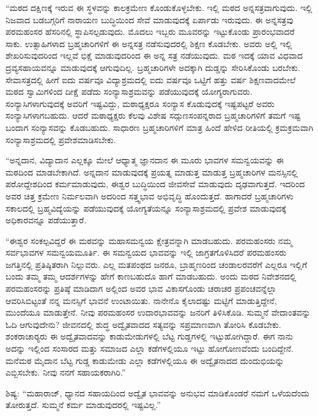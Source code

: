  “ಮಠದ ದಕ್ಷಿಣಕ್ಕೆ ಇರುವ ಈ ಸ್ಥಳವನ್ನು ಕಾಲಕ್ರಮೇಣ ಕೊಂಡುಕೊಳ್ಳಬೇಕು. ಇಲ್ಲಿ ಮಠದ ಅನ್ನಸತ್ರವಾಗುವುದು. ಇಲ್ಲಿ ನಿಜವಾದ ಬಡಬಗ್ಗರಿಗೆ ನಾರಾಯಣ ಬುದ್ಧಿಯಿಂದ ಸೇವೆ ಮಾಡುವುದಕ್ಕೆ ಏರ್ಪಾಡು ಇರುವುದು. ಈ ಅನ್ನಸತ್ರವು ಪರಮಹಂಸರ ಹೆಸರಿನಲ್ಲಿ ಸ್ಥಾಪಿಸಲ್ಪಡುವುದು. ಮೊದಲು ಇಬ್ಬರು ಮೂವರನ್ನು ಇಟ್ಟುಕೊಂಡು ಪ್ರಾರಂಭವಾದರೆ ಸಾಕು. ಉತ್ಸಾಹಿಗಳಾದ ಬ್ರಹ್ಮಚಾರಿಗಳಿಗೆ ಈ ಅನ್ನಸತ್ರ ನಡೆಸುವುದರಲ್ಲಿ ಶಿಕ್ಷಣ ಕೊಡಬೇಕು. ಅವರು ಅಲ್ಲಿ ಇಲ್ಲಿ ಶೇಖರಿಸುವುದರಿಂದ ಇಲ್ಲವೆ ಭಿಕ್ಷೆ ಮಾಡುವುದರಿಂದ ಈ ಅನ್ನ ಸತ್ರ ನಡೆಯುವುದು. ಮಠ ಇದಕ್ಕೆ ಯಾವ ವಿಧವಾದ ದ್ರವ್ಯಸಹಾಯವನ್ನೂ ಮಾಡುವುದಕ್ಕೆ ಆಗುವುದಿಲ್ಲ. ಬ್ರಹ್ಮಚಾರಿಗಳೇ ಅದಕ್ಕಾಗಿ ದುಡ್ಡನ್ನು ಸೇರಿಸಿಕೊಂಡು ಬರಬೇಕು. ಸೇವಾಸತ್ರದಲ್ಲಿ ಹೀಗೆ ಐದು ವರ್ಷವೂ ವಿದ್ಯಾಶ್ರಮದಲ್ಲಿ ಐದು ವರ್ಷವೂ ಒಟ್ಟಿಗೆ ಹತ್ತು ವರ್ಷ ಶಿಕ್ಷಣವಾದಮೇಲೆ ಮಠದ ಸ್ವಾಮಿಗಳಿಂದ ದೀಕ್ಷೆ ಪಡೆದು ಸಂನ್ಯಾಸಾಶ್ರಮವನ್ನು ಪಡೆಯುವುದಕ್ಕೆ ಯೋಗ್ಯರಾಗುವರು. ಸಂನ್ಯಾಸಿಗಳಾಗುವುದಕ್ಕೆ ಅವರಿಗೆ ಇಷ್ಟವಿದ್ದು, ಮಠಾಧ್ಯಕ್ಷರೂ ಸಂನ್ಯಾಸ ಕೊಡುವುದಕ್ಕೆ ಇಷ್ಟಪಟ್ಟರೆ ಅವರು ಸಂನ್ಯಾಸಿಗಳಾಗಬಹುದು. ಆದರೆ ಮಠಾಧ್ಯಕ್ಷರು ಕೆಲವು ವಿಶೇಷ ಸದ್ಗುಣಸಂಪನ್ನರಾದ ಬ್ರಹ್ಮಚಾರಿಗಳಿಗೆ ತಮಗೆ ಇಷ್ಟ ಬಂದಾಗ ಸಂನ್ಯಾಸವನ್ನು ಕೊಡಬಹುದು. ಸಾಧಾರಣ ಬ್ರಹ್ಮಚಾರಿಗಳಿಗೆ ಮಾತ್ರ ಹಿಂದೆ ಹೇಳಿದ ರೀತಿಯಲ್ಲಿ ಕ್ರಮಕ್ರಮವಾಗಿ ಸಂನ್ಯಾಸಾಶ್ರಮದಲ್ಲಿ ಪ್ರವೇಶಮಾಡಿಸಬೇಕು. 

 “ಅನ್ನದಾನ, ವಿದ್ಯಾದಾನ ಎಲ್ಲಕ್ಕೂ ಮೇಲೆ ಆಧ್ಯಾತ್ಮ ಜ್ಞಾನದಾನ ಈ ಮೂರು ಭಾವಗಳ ಸಮನ್ವಯವನ್ನು ಈ ಮಠದಿಂದ ಮಾಡಬೇಕಾಗಿದೆ. ಅನ್ನದಾನ ಮಾಡುವುದಕ್ಕೆ ಪ್ರಯತ್ನ ಮಾಡುತ್ತ ಮಾಡುತ್ತ ಬ್ರಹ್ಮಚಾರಿಗಳ ಮನಸ್ಸಿನಲ್ಲಿ ಪರೋದ್ದೇಶದಿಂದ ಕರ್ಮಮಾಡುವುದು, ಈಶ್ವರ ಬುದ್ಧಿಯಿಂದ ಜೀವಸೇವೆ ಮಾಡುವುದು ದೃಢವಾಗುತ್ತದೆ. ಇದರಿಂದ ಅವರ ಚಿತ್ತ ಕ್ರಮೇಣ ನಿರ್ಮಲವಾಗಿ ಅದರಿಂದ ಸತ್ತ್ವಭಾವ ಅಭಿವೃದ್ಧಿ ಹೊಂದುತ್ತದೆ. ಹಾಗಾದರೆ ಬ್ರಹ್ಮಚಾರಿಗಳು ಸಕಾಲದಲ್ಲಿ ಬ್ರಹ್ಮವಿದ್ಯೆಯನ್ನು ಪಡೆಯುವುದಕ್ಕೆ ಯೋಗ್ಯತೆಯನ್ನೂ ಸಂನ್ಯಾಸಾಶ್ರಮದಲ್ಲಿ ಪ್ರವೇಶ ಮಾಡುವುದಕ್ಕೆ ಅಧಿಕಾರವನ್ನೂ ಪಡೆಯುತ್ತಾರೆ. 

 “ಈಶ್ವರ ಸಂಕಲ್ಪವಿದ್ದರೆ ಈ ಮಠವನ್ನು ಮಹಾಸಮನ್ವಯ ಕ್ಷೇತ್ರವನ್ನಾಗಿ ಮಾಡಬಹುದು. ಪರಮಹಂಸರು ನಮ್ಮ ಸರ್ವಭಾವಗಳ ಸಮನ್ವಯಮೂರ್ತಿ. ಈ ಸಮನ್ವಯದ ಭಾವವನ್ನು ಇಲ್ಲಿ ಜಾಗ್ರತಗೊಳಿಸಿದರೆ ಪರಮಹಂಸರು ಜಗತ್ತಿನಲ್ಲಿ ಪ್ರತಿಷ್ಠಿತರಾಗಿ ನಿಲ್ಲುವರು. ಎಲ್ಲ ಮತಪಂಥದ ಜನರೂ, ಬ್ರಾಹ್ಮಣರಿಂದ ಚಂಡಾಲರವರೆಗೆ ಎಲ್ಲರೂ ಇಲ್ಲಿಗೆ ಬಂದು ತಮ್ಮ ತಮ್ಮ ಆದರ್ಶಗಳನ್ನು ಹೇಗೆ ಕಾಣಬಹುದೊ ಹಾಗೆ ಮಾಡಬಹುದು. ಅಂದು ಮಠದ ನಿವೇಶನದಲ್ಲಿ ಪರಮಹಂಸರನ್ನು ಪ್ರತಿಷ್ಠೆ ಮಾಡಿದಾಗ ಅಲ್ಲಿಂದ ಅವರ ಭಾವ ವಿಕಾಸಗೊಂಡು ಚರಾಚರ ಪ್ರಪಂಚವನ್ನೆಲ್ಲಾ ಆವರಿಸಿಬಿಟ್ಟಂತೆ ನನ್ನ ಮನಸ್ಸಿಗೆ ಭಾವನೆ ಉಂಟಾಯಿತು. ನಾನೇನೊ ಕೈಲಾದಷ್ಟು ಮಟ್ಟಿಗೆ ಮಾಡುತ್ತಿದ್ದೇನೆ, ಮುಂದೆಯೂ ಮಾಡುತ್ತೇನೆ. ನೀವು ಪರಮಹಂಸರ ಉದಾರಭಾವವನ್ನು ಜನರಿಗೆ ತಿಳಿಸಿಕೊಡಿ. ಸುಮ್ಮನೆ ವೇದಾಂತವನ್ನು ಓದಿ ಆಗುವುದೇನು? ಜೀವನದಲ್ಲಿ ಶುದ್ಧ ಅದ್ವೈತವಾದದ ಸತ್ಯವನ್ನು ಸಪ್ರಮಾಣವಾಗಿ ತೋರಿಸಿ ಕೊಡಬೇಕು. ಶಂಕರಾಚಾರ‍್ಯರು ಈ ಅದ್ವೈತವಾದವನ್ನು ಕಾಡುಮೇಡುಗಳಲ್ಲಿ ಬೆಟ್ಟ ಗುಡ್ಡಗಳಲ್ಲಿ ಇಟ್ಟುಹೋಗಿದ್ದಾರೆ. ಈಗ ನಾನು ಅದನ್ನು ಇಲ್ಲಿಂದ ಸಂಸಾರದ ಮತ್ತು ಸಮಾಜದ ಎಲ್ಲಾ ಕಡೆಗಳಲ್ಲಿಯೂ ಇಟ್ಟು ಹೋಗೋಣವೆಂದು ಬಂದಿದ್ದೇನೆ. ಮನೆಮಠ ಮೈದಾನ ಬೆಟ್ಟ ಗುಡ್ಡ ಕಾಡುಮೇಡು ಎಲ್ಲಾ ಕಡೆಗಳಲ್ಲಿಯೂ ಈ ಅದ್ವೈತನಾದದ ದುಂದುಭಿಯನ್ನು ಎಬ್ಬಿಸಬೇಕು. ನೀವು ನನಗೆ ಸಹಾಯಕರಾಗಿರಿ.” 

 ಶಿಷ್ಯ: “ಮಹಾರಾಜ್, ಧ್ಯಾನದ ಸಹಾಯದಿಂದ ಅದ್ವೈತ ಭಾವವನ್ನು ಅನುಭವ ಮಾಡಿಕೊಂಡರೆ ನಮಗೆ ಒಳೆಯದೆಂದು ತೋರುತ್ತದೆ. ಸುಮ್ಮನೆ ಕರ್ಮ ಮಾಡುವುದರಲ್ಲಿ ಇಷ್ಟವಿಲ್ಲ.” 

